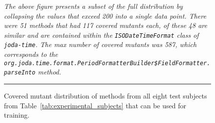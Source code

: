 \begin{figure}[!tb]
  \centering
  \caption{Covered mutant distribution of methods from all eight test subjects from Table~\ref{tab:experimental_subjects} that can be used for training.}
  \vspace{1mm}
  \footnotesize{\emph{The above figure presents a subset of the full distribution by collapsing the values that exceed 200 into a single data point. There were 51 methods that had 117 covered mutants each, of these 48 are similar and are contained within the \texttt{ISODateTimeFormat} class of \texttt{joda-time}. The max number of covered mutants was 587, which corresponds to the \texttt{org.joda.time.format.PeriodFormatterBuilder\$FieldFormatter.parseInto} method.}}
  \vspace{2mm}
  \hrule
  \label{fig:covered_mutant_distributions_method_all}
\end{figure}

